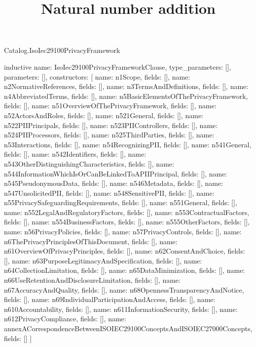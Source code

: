 \begin{lexlean}{Catalog.IsoIec29100PrivacyFramework}
\title{Natural number addition}
\begin{semanticmodule}
inductive{
  name: IsoIec29100PrivacyFrameworkClause,
  type_parameters: [],
  parameters: [],
  constructors: [
    {name: n1Scope, fields: []},
    {name: n2NormativeReferences, fields: []},
    {name: n3TermsAndDefinitions, fields: []},
    {name: n4AbbreviatedTerms, fields: []},
    {name: n5BasicElementsOfThePrivacyFramework, fields: []},
    {name: n51OverviewOfThePrivacyFramework, fields: []},
    {name: n52ActorsAndRoles, fields: []},
    {name: n521General, fields: []},
    {name: n522PIIPrincipals, fields: []},
    {name: n523PIIControllers, fields: []},
    {name: n524PIIProcessors, fields: []},
    {name: n525ThirdParties, fields: []},
    {name: n53Interactions, fields: []},
    {name: n54RecognizingPII, fields: []},
    {name: n541General, fields: []},
    {name: n542Identifiers, fields: []},
    {name: n543OtherDistinguishingCharacteristics, fields: []},
    {name: n544InformationWhichIsOrCanBeLinkedToAPIIPrincipal, fields: []},
    {name: n545PseudonymousData, fields: []},
    {name: n546Metadata, fields: []},
    {name: n547UnsolicitedPII, fields: []},
    {name: n548SensitivePII, fields: []},
    {name: n55PrivacySafeguardingRequirements, fields: []},
    {name: n551General, fields: []},
    {name: n552LegalAndRegulatoryFactors, fields: []},
    {name: n553ContractualFactors, fields: []},
    {name: n554BusinessFactors, fields: []},
    {name: n555OtherFactors, fields: []},
    {name: n56PrivacyPolicies, fields: []},
    {name: n57PrivacyControls, fields: []},
    {name: n6ThePrivacyPrinciplesOfThisDocument, fields: []},
    {name: n61OverviewOfPrivacyPrinciples, fields: []},
    {name: n62ConsentAndChoice, fields: []},
    {name: n63PurposeLegitimacyAndSpecification, fields: []},
    {name: n64CollectionLimitation, fields: []},
    {name: n65DataMinimization, fields: []},
    {name: n66UseRetentionAndDisclosureLimitation, fields: []},
    {name: n67AccuracyAndQuality, fields: []},
    {name: n68OpennessTransparencyAndNotice, fields: []},
    {name: n69IndividualParticipationAndAccess, fields: []},
    {name: n610Accountability, fields: []},
    {name: n611InformationSecurity, fields: []},
    {name: n612PrivacyCompliance, fields: []},
    {name: annexACorrespondenceBetweenISOIEC29100ConceptsAndISOIEC27000Concepts, fields: []}
  ]
}


\end{semanticmodule}
\end{lexlean}
